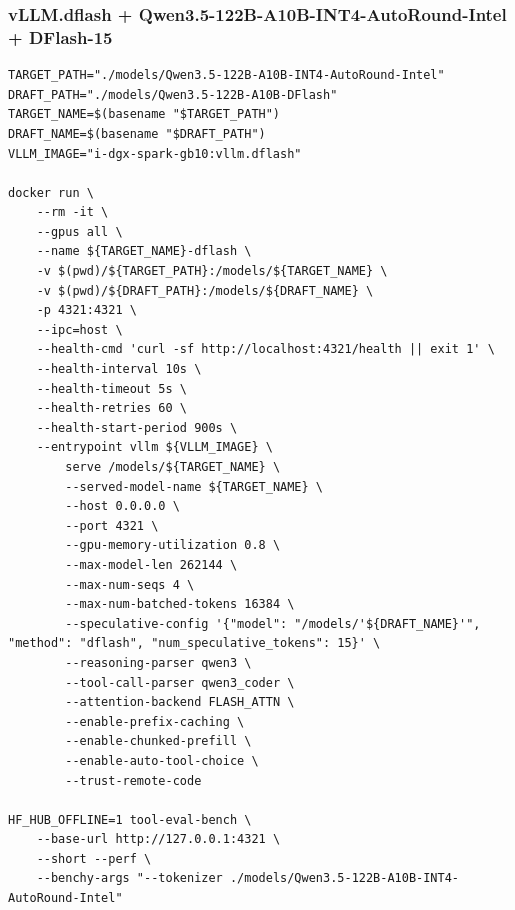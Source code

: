 \documentclass{article}
\begin{document}
\subsubsection{vLLM.dflash + Qwen3.5-122B-A10B-INT4-AutoRound-Intel + DFlash-15}
\begin{lstlisting}
TARGET_PATH="./models/Qwen3.5-122B-A10B-INT4-AutoRound-Intel"
DRAFT_PATH="./models/Qwen3.5-122B-A10B-DFlash"
TARGET_NAME=$(basename "$TARGET_PATH")
DRAFT_NAME=$(basename "$DRAFT_PATH")
VLLM_IMAGE="i-dgx-spark-gb10:vllm.dflash"

docker run \
    --rm -it \
    --gpus all \
    --name ${TARGET_NAME}-dflash \
    -v $(pwd)/${TARGET_PATH}:/models/${TARGET_NAME} \
    -v $(pwd)/${DRAFT_PATH}:/models/${DRAFT_NAME} \
    -p 4321:4321 \
    --ipc=host \
    --health-cmd 'curl -sf http://localhost:4321/health || exit 1' \
    --health-interval 10s \
    --health-timeout 5s \
    --health-retries 60 \
    --health-start-period 900s \
    --entrypoint vllm ${VLLM_IMAGE} \
        serve /models/${TARGET_NAME} \
        --served-model-name ${TARGET_NAME} \
        --host 0.0.0.0 \
        --port 4321 \
        --gpu-memory-utilization 0.8 \
        --max-model-len 262144 \
        --max-num-seqs 4 \
        --max-num-batched-tokens 16384 \
        --speculative-config '{"model": "/models/'${DRAFT_NAME}'", "method": "dflash", "num_speculative_tokens": 15}' \
        --reasoning-parser qwen3 \
        --tool-call-parser qwen3_coder \
        --attention-backend FLASH_ATTN \
        --enable-prefix-caching \
        --enable-chunked-prefill \
        --enable-auto-tool-choice \
        --trust-remote-code

HF_HUB_OFFLINE=1 tool-eval-bench \
    --base-url http://127.0.0.1:4321 \
    --short --perf \
    --benchy-args "--tokenizer ./models/Qwen3.5-122B-A10B-INT4-AutoRound-Intel"
\end{lstlisting}
\end{document}
